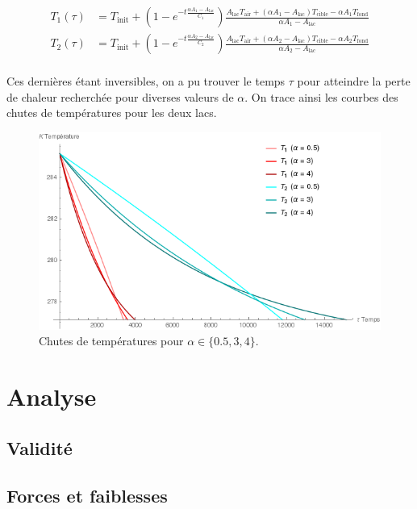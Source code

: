 \documentclass[12pt]{article}
\numberwithin{figure}{section}
\begin{document}
\begin{align*}
    T_1(\tau) &=
        T_\text{init} +
            \left(1-e^{\textstyle -t\frac{\alpha A_1-A_\text{lac}}{C_1}}\right)
            \frac
                {A_\text{lac} T_\text{air} + (\alpha A_1-A_\text{lac})T_\text{cible} - \alpha A_1 T_\text{fond}}
                {\alpha A_1-A_\text{lac}}\\
    T_2(\tau) &=
        T_\text{init} +
            \left(1-e^{\textstyle -t\frac{\alpha A_2-A_\text{lac}}{C_2}}\right)
            \frac
                {A_\text{lac} T_\text{air} + (\alpha A_2-A_\text{lac})T_\text{cible} - \alpha A_2 T_\text{fond}}
                {\alpha A_2-A_\text{lac}}\\
\end{align*}

Ces derni\`eres \'etant inversibles, on a pu trouver le temps $\tau$ pour atteindre la perte de
chaleur recherch\'ee pour diverses valeurs de $\alpha$. On trace ainsi les courbes des chutes de
temp\'eratures pour les deux lacs.

\begin{figure}
    \centering
    \includegraphics[scale=0.7]{Alpha.png}
    \caption{Chutes de temp\'eratures pour $\alpha \in \{0.5, 3, 4\}$.}
\end{figure}

\section{Analyse}
\subsection{Validit\'e}
\subsection{Forces et faiblesses}
\end{document}
